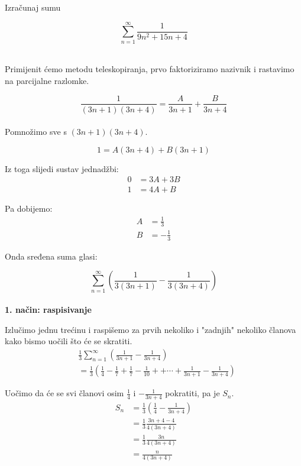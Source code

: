 \documentclass[exam.tex]{subfiles}
\begin{document}
	\begin{task}
		Izračunaj sumu
	
		\[ \sum\limits_{n=1}^\infty \frac{1}{9n^2 + 15n + 4} \] \\[1em]
	\end{task}
	
	Primijenit ćemo metodu teleskopiranja, prvo faktoriziramo nazivnik i rastavimo na parcijalne razlomke.
	
	\[ \frac{1}{(3n + 1)(3n + 4)} = \frac{A}{3n + 1} + \frac{B}{3n + 4} \] \\
	
	Pomnožimo sve s \( (3n + 1)(3n + 4) \).
	
	\[ 1 = A(3n + 4) + B(3n + 1) \]
	
	Iz toga slijedi sustav jednadžbi:
	\begin{align*}
		0 &= 3A + 3B \\
		1 &= 4A + B
	\end{align*}
	
	Pa dobijemo:
	\begin{align*}
		A &= \frac{1}{3} \\
		B &= - \frac{1}{3}
	\end{align*}
	
	Onda sređena suma glasi:
	
	\[ \sum\limits_{n=1}^\infty \left ( \frac{1}{3(3n + 1)} - \frac{1}{3(3n + 4)} \right ) \] \\
	
	\textbf{1. način: raspisivanje}
	
	Izlučimo jednu trećinu i raspišemo za prvih nekoliko i "zadnjih" nekoliko članova kako bismo uočili što će se skratiti.
	\begin{align*}
		& \frac{1}{3} \sum\limits_{n=1}^\infty \left ( \frac{1}{3n + 1} - \frac{1}{3n + 4} \right ) \\ 
		&= \frac{1}{3} \left ( \frac{1}{4} - \frac{1}{7} + \frac{1}{7} - \frac{1}{10} +  + \cdots + \frac{1}{3n + 1} - \frac{1}{3n + 4} \right )
	\end{align*}
	
	Uočimo da će se svi članovi osim \( \frac{1}{4} \) i \( - \frac{1}{3n + 4} \) pokratiti, pa je \( S_n \).
	\begin{align*}
		S_n &= \frac{1}{3} \left ( \frac{1}{4} - \frac{1}{3n + 4} \right ) \\
		&= \frac{1}{3} \frac{3n + 4 - 4}{4(3n + 4)} \\
		&= \frac{1}{3} \frac{3n}{4(3n + 4)} \\
		&= \frac{n}{4(3n + 4)}
	\end{align*}		
	
\end{document}
